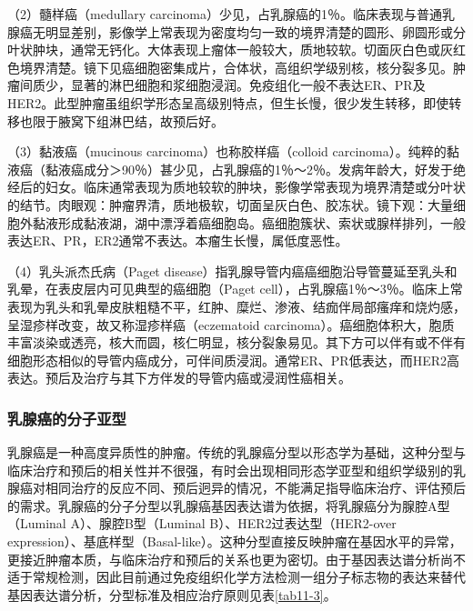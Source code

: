 （2）髓样癌（medullary
carcinoma）少见，占乳腺癌的1％。临床表现与普通乳腺癌无明显差别，影像学上常表现为密度均匀一致的境界清楚的圆形、卵圆形或分叶状肿块，通常无钙化。大体表现上瘤体一般较大，质地较软。切面灰白色或灰红色境界清楚。镜下见癌细胞密集成片，合体状，高组织学级别核，核分裂多见。肿瘤间质少，显著的淋巴细胞和浆细胞浸润。免疫组化一般不表达ER、PR及HER2。此型肿瘤虽组织学形态呈高级别特点，但生长慢，很少发生转移，即使转移也限于腋窝下组淋巴结，故预后好。

（3）黏液癌（mucinous carcinoma）也称胶样癌（colloid
carcinoma）。纯粹的黏液癌（黏液癌成分＞90％）甚少见，占乳腺癌的1％～2％。发病年龄大，好发于绝经后的妇女。临床通常表现为质地较软的肿块，影像学常表现为境界清楚或分叶状的结节。肉眼观：肿瘤界清，质地极软，切面呈灰白色、胶冻状。镜下观：大量细胞外黏液形成黏液湖，湖中漂浮着癌细胞岛。癌细胞簇状、索状或腺样排列，一般表达ER、PR，ER2通常不表达。本瘤生长慢，属低度恶性。

（4）乳头派杰氏病（Paget
disease）指乳腺导管内癌癌细胞沿导管蔓延至乳头和乳晕，在表皮层内可见典型的癌细胞（Paget
cell），占乳腺癌1％～3％。临床上常表现为乳头和乳晕皮肤粗糙不平，红肿、糜烂、渗液、结痂伴局部瘙痒和烧灼感，呈湿疹样改变，故又称湿疹样癌（eczematoid
carcinoma）。癌细胞体积大，胞质丰富淡染或透亮，核大而圆，核仁明显，核分裂象易见。其下方可以伴有或不伴有细胞形态相似的导管内癌成分，可伴间质浸润。通常ER、PR低表达，而HER2高表达。预后及治疗与其下方伴发的导管内癌或浸润性癌相关。

\subsubsection{乳腺癌的分子亚型}

乳腺癌是一种高度异质性的肿瘤。传统的乳腺癌分型以形态学为基础，这种分型与临床治疗和预后的相关性并不很强，有时会出现相同形态学亚型和组织学级别的乳腺癌对相同治疗的反应不同、预后迥异的情况，不能满足指导临床治疗、评估预后的需求。乳腺癌的分子分型以乳腺癌基因表达谱为依据，将乳腺癌分为腺腔A型（Luminal
A）、腺腔B型（Luminal B）、HER2过表达型（HER2-over
expression）、基底样型（Basal-like）。这种分型直接反映肿瘤在基因水平的异常，更接近肿瘤本质，与临床治疗和预后的关系也更为密切。由于基因表达谱分析尚不适于常规检测，因此目前通过免疫组织化学方法检测一组分子标志物的表达来替代基因表达谱分析，分型标准及相应治疗原则见表\ref{tab11-3}。

